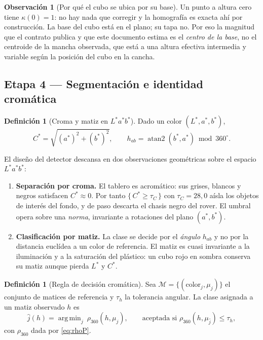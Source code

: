 \documentclass[11pt,a4paper]{article}
\theoremstyle{definition}
\newtheorem{definicion}[teorema]{Definición}
\newtheorem{observacion}[teorema]{Observación}
\DeclareMathOperator*{\argmin}{arg\,min}
\newcommand{\atantwo}{\operatorname{atan2}}
\newcommand{\grados}{^{\circ}}
\begin{document}
\begin{observacion}[Por qué el cubo se ubica por su base]
Un punto a altura cero tiene $\kappa(0)=1$: no hay nada que corregir y la homografía es
exacta ahí por construcción. La base del cubo está en el plano; su tapa no. Por eso la
magnitud que el contrato publica y que este documento estima es el \emph{centro de la
base}, no el centroide de la mancha observada, que está a una altura efectiva
intermedia y variable según la posición del cubo en la cancha.
\end{observacion}

\subsection{Etapa 4 --- Segmentación e identidad cromática}

\begin{definicion}[Croma y matiz en $L^\ast a^\ast b^\ast$]
Dado un color $(L^\ast, a^\ast, b^\ast)$,
\begin{equation}
  C^\ast = \sqrt{(a^\ast)^2 + (b^\ast)^2},
  \qquad
  h_{ab} = \atantwo(b^\ast, a^\ast) \bmod 360\grados .
  \label{eq:croma}
\end{equation}
\end{definicion}

El diseño del detector descansa en dos observaciones geométricas sobre el espacio
$L^\ast a^\ast b^\ast$:

\begin{enumerate}[label=(\roman*),leftmargin=2.4em]
\item \textbf{Separación por croma.} El tablero es acromático: sus grises, blancos y
      negros satisfacen $C^\ast \approx 0$. Por tanto
      $\{\,C^\ast \ge \tau_C\,\}$ con $\tau_C = 28{,}0$ aísla los objetos de interés del
      fondo, y de paso descarta el chasis negro del rover. El umbral opera sobre una
      \emph{norma}, invariante a rotaciones del plano $(a^\ast,b^\ast)$.
\item \textbf{Clasificación por matiz.} La clase se decide por el \emph{ángulo}
      $h_{ab}$ y no por la distancia euclídea a un color de referencia. El matiz es
      cuasi invariante a la iluminación y a la saturación del plástico: un cubo rojo en
      sombra conserva su matiz aunque pierda $L^\ast$ y $C^\ast$.
\end{enumerate}

\begin{definicion}[Regla de decisión cromática]
Sea $\mathcal{M} = \{(\text{color}_j, \mu_j)\}$ el conjunto de matices de referencia y
$\tau_h$ la tolerancia angular. La clase asignada a un matiz observado $h$ es
\begin{equation}
  \hat{j}(h) = \argmin_{j} \ \rho_{360}(h, \mu_j),
  \qquad\text{aceptada si } \rho_{360}(h,\mu_{\hat j}) \le \tau_h ,
  \label{eq:clasif}
\end{equation}
con $\rho_{360}$ dada por \eqref{eq:rhoP}.
\end{definicion}
\end{document}
